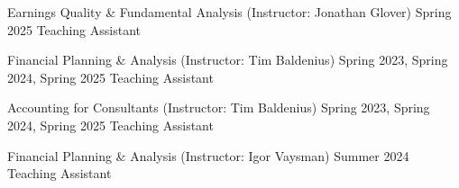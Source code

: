 

\begin{cventries}

\cventrysimple
    {Earnings Quality \& Fundamental Analysis (Instructor: Jonathan Glover)}  %
    {Spring 2025} %
    {Teaching Assistant}
	
\cventrysimple
    {Financial Planning \& Analysis (Instructor: Tim Baldenius)}  %
    {Spring 2023, Spring 2024, Spring 2025} %
    {Teaching Assistant}
	
\cventrysimple
	{Accounting for Consultants (Instructor: Tim Baldenius)}  %
    {Spring 2023, Spring 2024, Spring 2025} %
    {Teaching Assistant}
    
\cventrysimple
    {Financial Planning \& Analysis (Instructor: Igor Vaysman)}  %
    {Summer 2024} %
    {Teaching Assistant}

\end{cventries}
